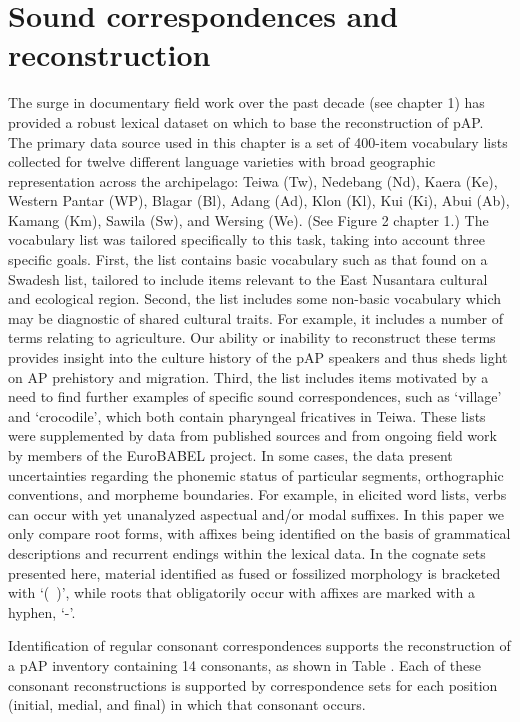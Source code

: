 \section{Sound correspondences and reconstruction}
\label{bkm:Ref214155962}The surge in documentary field work over the past decade (see chapter 1) has provided a robust lexical dataset on which to base the reconstruction of pAP. The primary data source used in this chapter is a set of 400-item vocabulary lists collected for twelve different language varieties with broad geographic representation across the archipelago: Teiwa (Tw), Nedebang (Nd), Kaera (Ke), Western Pantar (WP), Blagar (Bl), Adang (Ad), Klon (Kl), Kui (Ki), Abui (Ab), Kamang (Km), Sawila (Sw), and Wersing (We). (See Figure 2 chapter 1.) The vocabulary list was tailored specifically to this task, taking into account three specific goals. First, the list contains basic vocabulary such as that found on a Swadesh list, tailored to include items relevant to the East Nusantara cultural and ecological region. Second, the list includes some non-basic vocabulary which may be diagnostic of shared cultural traits. For example, it includes a number of terms relating to agriculture. Our ability or
inability to reconstruct these terms provides insight into the culture history of the pAP speakers and thus sheds light on AP prehistory and migration. Third, the list includes items motivated by a need to find further examples of specific sound correspondences, such as `village' and `crocodile', which both contain pharyngeal fricatives in Teiwa. These lists were supplemented by data from published sources and from ongoing field work by members of the EuroBABEL project. In some cases, the data present uncertainties regarding the phonemic status of particular segments, orthographic conventions, and morpheme boundaries. For example, in elicited word lists, verbs can occur with yet unanalyzed aspectual and/or modal suffixes. In this paper we only compare root forms, with affixes being identified on the basis of grammatical descriptions and recurrent endings within the lexical data. In the cognate sets presented here, material identified as fused or fossilized morphology is bracketed with `(~)', while roots that
obligatorily occur with affixes are marked with a hyphen, `-'.

Identification of regular consonant correspondences supports the reconstruction of a pAP inventory containing 14 consonants, as shown in Table . Each of these consonant reconstructions is supported by correspondence sets for each position (initial, medial, and final) in which that consonant occurs.



